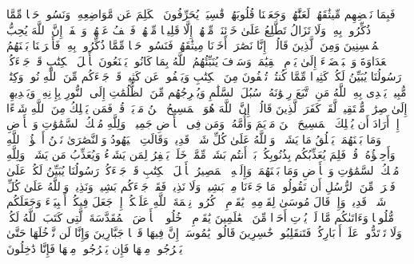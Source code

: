 \stopbuffer
\startbuffer[\q:5:13]
فَبِمَا نَقۡضِهِم مِّیثَٰقَهُمۡ لَعَنَّٰهُمۡ وَجَعَلۡنَا قُلُوبَهُمۡ قَٰسِیَةࣰۖ یُحَرِّفُونَ ٱلۡكَلِمَ عَن مَّوَاضِعِهِۦ وَنَسُوا۟ حَظࣰّا مِّمَّا ذُكِّرُوا۟ بِهِۦۚ وَلَا تَزَالُ تَطَّلِعُ عَلَىٰ خَاۤئِنَةࣲ مِّنۡهُمۡ إِلَّا قَلِیلࣰا مِّنۡهُمۡۖ فَٱعۡفُ عَنۡهُمۡ وَٱصۡفَحۡۚ إِنَّ ٱللَّهَ یُحِبُّ ٱلۡمُحۡسِنِینَ%
\stopbuffer
\startbuffer[\q:5:14]
وَمِنَ ٱلَّذِینَ قَالُوۤا۟ إِنَّا نَصَٰرَىٰۤ أَخَذۡنَا مِیثَٰقَهُمۡ فَنَسُوا۟ حَظࣰّا مِّمَّا ذُكِّرُوا۟ بِهِۦ فَأَغۡرَیۡنَا بَیۡنَهُمُ ٱلۡعَدَاوَةَ وَٱلۡبَغۡضَاۤءَ إِلَىٰ یَوۡمِ ٱلۡقِیَٰمَةِۚ وَسَوۡفَ یُنَبِّئُهُمُ ٱللَّهُ بِمَا كَانُوا۟ یَصۡنَعُونَ%
\stopbuffer
\startbuffer[\q:5:15]
یَٰۤأَهۡلَ ٱلۡكِتَٰبِ قَدۡ جَاۤءَكُمۡ رَسُولُنَا یُبَیِّنُ لَكُمۡ كَثِیرࣰا مِّمَّا كُنتُمۡ تُخۡفُونَ مِنَ ٱلۡكِتَٰبِ وَیَعۡفُوا۟ عَن كَثِیرࣲۚ قَدۡ جَاۤءَكُم مِّنَ ٱللَّهِ نُورࣱ وَكِتَٰبࣱ مُّبِینࣱ%
\stopbuffer
\startbuffer[\q:5:16]
یَهۡدِی بِهِ ٱللَّهُ مَنِ ٱتَّبَعَ رِضۡوَٰنَهُۥ سُبُلَ ٱلسَّلَٰمِ وَیُخۡرِجُهُم مِّنَ ٱلظُّلُمَٰتِ إِلَى ٱلنُّورِ بِإِذۡنِهِۦ وَیَهۡدِیهِمۡ إِلَىٰ صِرَٰطࣲ مُّسۡتَقِیمࣲ%
\stopbuffer
\startbuffer[\q:5:17]
لَّقَدۡ كَفَرَ ٱلَّذِینَ قَالُوۤا۟ إِنَّ ٱللَّهَ هُوَ ٱلۡمَسِیحُ ٱبۡنُ مَرۡیَمَۚ قُلۡ فَمَن یَمۡلِكُ مِنَ ٱللَّهِ شَیۡءًا إِنۡ أَرَادَ أَن یُهۡلِكَ ٱلۡمَسِیحَ ٱبۡنَ مَرۡیَمَ وَأُمَّهُۥ وَمَن فِی ٱلۡأَرۡضِ جَمِیعࣰاۗ وَلِلَّهِ مُلۡكُ ٱلسَّمَٰوَٰتِ وَٱلۡأَرۡضِ وَمَا بَیۡنَهُمَاۚ یَخۡلُقُ مَا یَشَاۤءُۚ وَٱللَّهُ عَلَىٰ كُلِّ شَیۡءࣲ قَدِیرࣱ%
\stopbuffer
\startbuffer[\q:5:18]
وَقَالَتِ ٱلۡیَهُودُ وَٱلنَّصَٰرَىٰ نَحۡنُ أَبۡنَٰۤؤُا۟ ٱللَّهِ وَأَحِبَّٰۤؤُهُۥۚ قُلۡ فَلِمَ یُعَذِّبُكُم بِذُنُوبِكُمۖ بَلۡ أَنتُم بَشَرࣱ مِّمَّنۡ خَلَقَۚ یَغۡفِرُ لِمَن یَشَاۤءُ وَیُعَذِّبُ مَن یَشَاۤءُۚ وَلِلَّهِ مُلۡكُ ٱلسَّمَٰوَٰتِ وَٱلۡأَرۡضِ وَمَا بَیۡنَهُمَاۖ وَإِلَیۡهِ ٱلۡمَصِیرُ%
\stopbuffer
\startbuffer[\q:5:19]
یَٰۤأَهۡلَ ٱلۡكِتَٰبِ قَدۡ جَاۤءَكُمۡ رَسُولُنَا یُبَیِّنُ لَكُمۡ عَلَىٰ فَتۡرَةࣲ مِّنَ ٱلرُّسُلِ أَن تَقُولُوا۟ مَا جَاۤءَنَا مِنۢ بَشِیرࣲ وَلَا نَذِیرࣲۖ فَقَدۡ جَاۤءَكُم بَشِیرࣱ وَنَذِیرࣱۗ وَٱللَّهُ عَلَىٰ كُلِّ شَیۡءࣲ قَدِیرࣱ%
\stopbuffer
\startbuffer[\q:5:20]
وَإِذۡ قَالَ مُوسَىٰ لِقَوۡمِهِۦ یَٰقَوۡمِ ٱذۡكُرُوا۟ نِعۡمَةَ ٱللَّهِ عَلَیۡكُمۡ إِذۡ جَعَلَ فِیكُمۡ أَنۢبِیَاۤءَ وَجَعَلَكُم مُّلُوكࣰا وَءَاتَىٰكُم مَّا لَمۡ یُؤۡتِ أَحَدࣰا مِّنَ ٱلۡعَٰلَمِینَ%
\stopbuffer
\startbuffer[\q:5:21]
یَٰقَوۡمِ ٱدۡخُلُوا۟ ٱلۡأَرۡضَ ٱلۡمُقَدَّسَةَ ٱلَّتِی كَتَبَ ٱللَّهُ لَكُمۡ وَلَا تَرۡتَدُّوا۟ عَلَىٰۤ أَدۡبَارِكُمۡ فَتَنقَلِبُوا۟ خَٰسِرِینَ%
\stopbuffer
\startbuffer[\q:5:22]
قَالُوا۟ یَٰمُوسَىٰۤ إِنَّ فِیهَا قَوۡمࣰا جَبَّارِینَ وَإِنَّا لَن نَّدۡخُلَهَا حَتَّىٰ یَخۡرُجُوا۟ مِنۡهَا فَإِن یَخۡرُجُوا۟ مِنۡهَا فَإِنَّا دَٰخِلُونَ%
